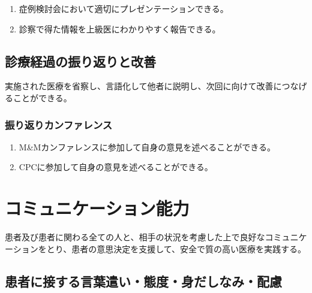 \documentclass[
]{ltjsarticle}
\providecommand{\tightlist}{%
  \setlength{\itemsep}{0pt}\setlength{\parskip}{0pt}}
\begin{document}
\begin{enumerate}
\def\labelenumi{\arabic{enumi}.}
\tightlist
\item
  症例検討会において適切にプレゼンテーションできる。
\item
  診察で得た情報を上級医にわかりやすく報告できる。
\end{enumerate}

\hypertarget{ux8a3aux7642ux7d4cux904eux306eux632fux308aux8fd4ux308aux3068ux6539ux5584}{%
\subsection{診療経過の振り返りと改善}\label{ux8a3aux7642ux7d4cux904eux306eux632fux308aux8fd4ux308aux3068ux6539ux5584}}

実施された医療を省察し、言語化して他者に説明し、次回に向けて改善につなげることができる。

\hypertarget{ux632fux308aux8fd4ux308aux30abux30f3ux30d5ux30a1ux30ecux30f3ux30b9}{%
\subsubsection{振り返りカンファレンス}\label{ux632fux308aux8fd4ux308aux30abux30f3ux30d5ux30a1ux30ecux30f3ux30b9}}

\begin{enumerate}
\def\labelenumi{\arabic{enumi}.}
\tightlist
\item
  M\&Mカンファレンスに参加して自身の意見を述べることができる。
\item
  CPCに参加して自身の意見を述べることができる。
\end{enumerate}

\newpage

\hypertarget{ux30b3ux30dfux30e5ux30cbux30b1ux30fcux30b7ux30e7ux30f3ux80fdux529b}{%
\section{コミュニケーション能力}\label{ux30b3ux30dfux30e5ux30cbux30b1ux30fcux30b7ux30e7ux30f3ux80fdux529b}}

患者及び患者に関わる全ての人と、相手の状況を考慮した上で良好なコミュニケーションをとり、患者の意思決定を支援して、安全で質の高い医療を実践する。

\hypertarget{ux60a3ux8005ux306bux63a5ux3059ux308bux8a00ux8449ux9063ux3044ux614bux5ea6ux8eabux3060ux3057ux306aux307fux914dux616e}{%
\subsection{患者に接する言葉遣い・態度・身だしなみ・配慮}\label{ux60a3ux8005ux306bux63a5ux3059ux308bux8a00ux8449ux9063ux3044ux614bux5ea6ux8eabux3060ux3057ux306aux307fux914dux616e}}
\end{document}
